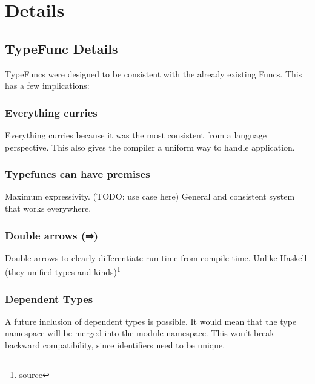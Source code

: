 \section{Details}

\pagebreak

\subsection{TypeFunc Details}
\begin{multicols}{2}\noindent
  TypeFuncs were designed to be consistent with the already existing Funcs.
  This has a few implications:

  \subsubsection*{Everything curries}
  Everything curries because it was the most consistent from a language perspective.
  This also gives the compiler a uniform way to handle application.
  
  \subsubsection*{Typefuncs can have premises}
  Maximum expressivity. (TODO: use case here)
  General and consistent system that works everywhere.

  \subsubsection*{Double arrows (⇒)}
  Double arrows to clearly differentiate run-time from compile-time.
  Unlike Haskell (they unified types and kinds)\footnote{source}

  \subsubsection*{Dependent Types}
  A future inclusion of dependent types is possible.
  It would mean that the type namespace will be merged into the module namespace.
  This won't break backward compatibility, since identifiers need to be unique.
\end{multicols}

\pagebreak
